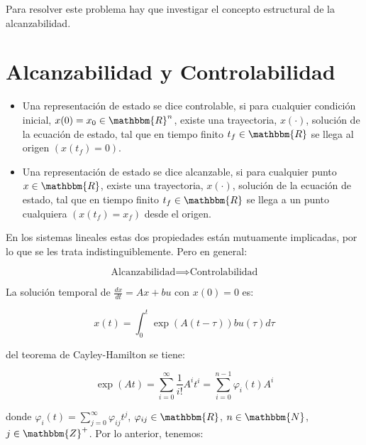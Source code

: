     Para resolver este problema hay que investigar el concepto estructural de la alcanzabilidad.

    \newpage
    \section{Alcanzabilidad y Controlabilidad}

        \begin{itemize}
            \item Una representación de estado se dice controlable, si para cualquier condición inicial, $x(0) = x_0 \in \mathbbm{R}^n$, existe una trayectoria, $x(\cdot)$, solución de la ecuación de estado, tal que en tiempo finito $t_f \in \mathbbm{R}$ se llega al origen $\left( x(t_f) = 0 \right)$.
            \item Una representación de estado se dice alcanzable, si para cualquier punto $x \in \mathbbm{R}$, existe una trayectoria, $x(\cdot)$, solución de la ecuación de estado, tal que en tiempo finito $t_f \in \mathbbm{R}$ se llega a un punto cualquiera $\left( x(t_f) = x_f \right)$ desde el origen.
        \end{itemize}

        En los sistemas lineales estas dos propiedades están mutuamente implicadas, por lo que se les trata indistinguiblemente. Pero en general:

        \begin{equation}
            \text{Alcanzabilidad} \implies \text{Controlabilidad}
        \end{equation}

        La solución temporal de $\frac{dx}{dt} = Ax + bu$ con $x(0) = 0$ es:

        \begin{equation}
            x(t) = \int_0^t \exp{(A(t - \tau))} b u(\tau) d \tau
        \end{equation}

        del teorema de Cayley-Hamilton se tiene:

        \begin{equation}
            \exp{(A t)} = \sum\limits_{i=0}^{\infty} \frac{1}{i!} A^i t^i = \sum\limits_{i=0}^{n-1} \varphi_i(t) A^i
        \end{equation}

        donde $\varphi_i(t) = \sum\limits_{j=0}^{\infty} \varphi_{ij} t^j$, $\varphi_{ij} \in \mathbbm{R}$, $n \in \mathbbm{N}$, $j \in \mathbbm{Z}^+$. Por lo anterior, tenemos:

